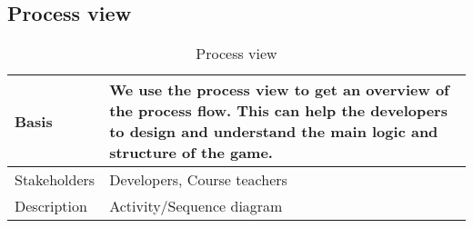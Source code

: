\vspace{-20pt}

\subsection{Process view}

\begin{table}[h!]
\begin{tabular}{ | p{90pt} | p{270pt}  |}
\hline
Basis	 & We use the process view to get an overview of the process flow. This can help the developers to design and understand the main logic and structure of the game. \\ \hline
Stakeholders & Developers, Course teachers\\ \hline 
Description & Activity/Sequence diagram \\ \hline


\end{tabular}

\caption{Process view}

\end{table}

\vspace{-20pt}







